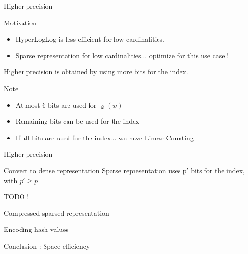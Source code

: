 \documentclass{beamer}
\begin{document}


\begin{frame}{Higher precision}


\begin{block}{Motivation}
\begin{itemize}
\item HyperLogLog is less efficient for low cardinalities. 
\item Sparse representation for low cardinalities... optimize for this use case !
\end{itemize}
\end{block}

Higher precision is obtained by using more bits for the index. 

\begin{block}{Note}
\begin{itemize} 
\item At most 6 bits are used for $\varrho(w)$
\item Remaining bits can be used for the index
\item If all bits are used for the index... we have Linear Counting
\end{itemize}
\end{block}

\end{frame}



\begin{frame}{Higher precision}


\begin{block}{Convert to dense representation}
Sparse representation uses p' bits for the index, with $p' \ge p$

TODO !
\end{block}

\end{frame}




\begin{frame}{Compressed sparsed representation}


\end{frame}



\begin{frame}{Encoding hash values}
\end{frame}

\begin{frame}{Conclusion : Space efficiency}
\end{frame}
\end{document}
